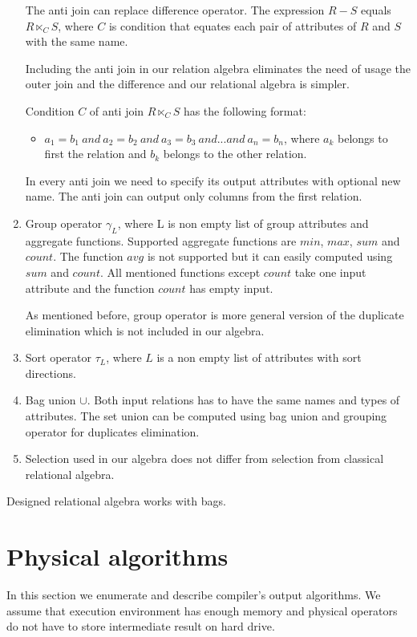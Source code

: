 \begin{enumerate}
The anti join can replace difference operator. The expression $R-S$ equals $R \ltimes_C S$, where $C$ is condition that equates each pair of attributes of $R$ and $S$ with the same name.
 
Including the anti join in our relation algebra eliminates the need of usage the outer join and the difference and our relational algebra is simpler.

Condition $C$ of anti join $R \ltimes_C S$ has the following format:
\begin{itemize}
\item $a_1=b_1~and~a_2=b_2~and~a_3=b_3~and...and~a_n=b_n$, where $a_k$ belongs to first the relation and $b_k$ belongs to the other relation.
\end{itemize}
In every anti join we need to specify its output attributes with optional new name. The anti join can output only columns from the first relation. 
\item Group operator $\gamma_L$, where L is non empty list of group attributes and aggregate functions. Supported aggregate functions are $min$, $max$, $sum$ and $count$. The function $avg$ is not supported but it can easily computed using $sum$ and $count$. All mentioned functions except $count$ take one input attribute and the function $count$ has empty input. 

As mentioned before, group operator is more general version of the duplicate elimination which is not included in our algebra.
\item Sort operator $\tau_L$, where $L$ is a non empty list of attributes with sort directions.
\item Bag union $\cup$. Both input relations has to have the same names and types of attributes. The set union can be computed using bag union and grouping operator for duplicates elimination.
\item Selection used in our algebra does not differ from selection from classical relational algebra.

\end{enumerate}

Designed relational algebra works with bags.

\section{Physical algorithms}

In this section we enumerate and describe compiler's output algorithms. We assume that execution environment has enough memory and physical operators do not have to store intermediate result on hard drive.

